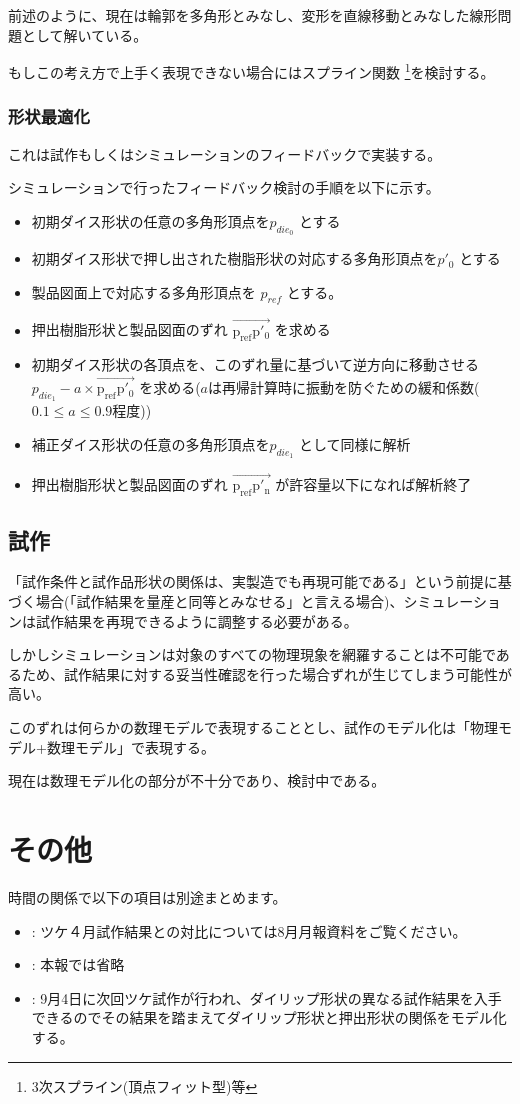 \documentclass[report]{jlreq}
\begin{document}
前述のように、現在は輪郭を多角形とみなし、変形を直線移動とみなした線形問題として解いている。

もしこの考え方で上手く表現できない場合にはスプライン関数 \footnote{3次スプライン(頂点フィット型)等}を検討する。

\newpage

\subsection{形状最適化}
これは試作もしくはシミュレーションのフィードバックで実装する。

シミュレーションで行ったフィードバック検討の手順を以下に示す。

\begin{itemize}
  \item 初期ダイス形状の任意の多角形頂点を$p_{die_0}$ とする
  \item 初期ダイス形状で押し出された樹脂形状の対応する多角形頂点を$p'_0$ とする
  \item 製品図面上で対応する多角形頂点を $p_{ref}$ とする。
  \item 押出樹脂形状と製品図面のずれ $\overrightarrow{\mathrm{p_{ref}  p'_0}}$ を求める
  \item 初期ダイス形状の各頂点を、このずれ量に基づいて逆方向に移動させる $ p_{die_1} - a\times \overrightarrow{\mathrm{p_{ref}  p'_0}}$ を求める({\small $a$は再帰計算時に振動を防ぐための緩和係数($0.1\leq a \leq0.9$程度)})
  \item 補正ダイス形状の任意の多角形頂点を$p_{die_1}$ として同様に解析
  \item 押出樹脂形状と製品図面のずれ $\overrightarrow{\mathrm{p_{ref}  p'_n}}$ が許容量以下になれば解析終了
\end{itemize}

\section{試作}
「試作条件と試作品形状の関係は、実製造でも再現可能である」という前提に基づく場合({\small 「試作結果を量産と同等とみなせる」と言える場合})、シミュレーションは試作結果を再現できるように調整する必要がある。

しかしシミュレーションは対象のすべての物理現象を網羅することは不可能であるため、試作結果に対する妥当性確認を行った場合ずれが生じてしまう可能性が高い。

このずれは何らかの数理モデルで表現することとし、試作のモデル化は「物理モデル+数理モデル」で表現する。

現在は数理モデル化の部分が不十分であり、検討中である。



\chapter{その他}
時間の関係で以下の項目は別途まとめます。

\begin{itemize}
  \item {} : ツケ４月試作結果との対比については8月月報資料をご覧ください。
  \item {} : 本報では省略
  \item {} : 9月4日に次回ツケ試作が行われ、ダイリップ形状の異なる試作結果を入手できるのでその結果を踏まえてダイリップ形状と押出形状の関係をモデル化する。
\end{itemize}
\end{document}
